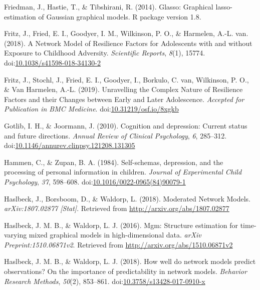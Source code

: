 \documentclass[man,floatsintext]{apa6}
\begin{document}
\leavevmode\hypertarget{ref-friedman_glasso:_2014}{}%
Friedman, J., Hastie, T., \& Tibshirani, R. (2014). Glasso: Graphical lasso- estimation of Gaussian graphical models. R package version 1.8.

\leavevmode\hypertarget{ref-fritz_network_2018}{}%
Fritz, J., Fried, E. I., Goodyer, I. M., Wilkinson, P. O., \& Harmelen, A.-L. van. (2018). A Network Model of Resilience Factors for Adolescents with and without Exposure to Childhood Adversity. \emph{Scientific Reports}, \emph{8}(1), 15774. doi:\href{https://doi.org/10.1038/s41598-018-34130-2}{10.1038/s41598-018-34130-2}

\leavevmode\hypertarget{ref-fritz_unravelling_2019}{}%
Fritz, J., Stochl, J., Fried, E. I., Goodyer, I., Borkulo, C. van, Wilkinson, P. O., \& Van Harmelen, A.-L. (2019). Unravelling the Complex Nature of Resilience Factors and their Changes between Early and Later Adolescence. \emph{Accepted for Publication in BMC Medicine}. doi:\href{https://doi.org/10.31219/osf.io/8xgkb}{10.31219/osf.io/8xgkb}

\leavevmode\hypertarget{ref-Gotlib2010}{}%
Gotlib, I. H., \& Joormann, J. (2010). Cognition and depression: Current status and future directions. \emph{Annual Review of Clinical Psychology}, \emph{6}, 285--312. doi:\href{https://doi.org/10.1146/annurev.clinpsy.121208.131305}{10.1146/annurev.clinpsy.121208.131305}

\leavevmode\hypertarget{ref-Hammen1984}{}%
Hammen, C., \& Zupan, B. A. (1984). Self-schemas, depression, and the processing of personal information in children. \emph{Journal of Experimental Child Psychology}, \emph{37}, 598--608. doi:\href{https://doi.org/10.1016/0022-0965(84)90079-1}{10.1016/0022-0965(84)90079-1}

\leavevmode\hypertarget{ref-haslbeck_moderated_2018}{}%
Haslbeck, J., Borsboom, D., \& Waldorp, L. (2018). Moderated Network Models. \emph{arXiv:1807.02877 {[}Stat{]}}. Retrieved from \url{http://arxiv.org/abs/1807.02877}

\leavevmode\hypertarget{ref-R-mgm}{}%
Haslbeck, J. M. B., \& Waldorp, L. J. (2016). Mgm: Structure estimation for time-varying mixed graphical models in high-dimensional data. \emph{arXiv Preprint:1510.06871v2}. Retrieved from \url{http://arxiv.org/abs/1510.06871v2}

\leavevmode\hypertarget{ref-haslbeck_how_2018}{}%
Haslbeck, J. M. B., \& Waldorp, L. J. (2018). How well do network models predict observations? On the importance of predictability in network models. \emph{Behavior Research Methods}, \emph{50}(2), 853--861. doi:\href{https://doi.org/10.3758/s13428-017-0910-x}{10.3758/s13428-017-0910-x}
\end{document}
